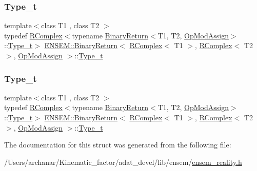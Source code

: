 \subsubsection{\texorpdfstring{Type\_t}{Type\_t}\hspace{0.1cm}{\footnotesize\ttfamily [1/2]}}
{\footnotesize\ttfamily template$<$class T1 , class T2 $>$ \\
typedef \mbox{\hyperlink{classENSEM_1_1RComplex}{R\+Complex}}$<$typename \mbox{\hyperlink{structENSEM_1_1BinaryReturn}{Binary\+Return}}$<$T1, T2, \mbox{\hyperlink{structENSEM_1_1OpModAssign}{Op\+Mod\+Assign}}$>$\+::\mbox{\hyperlink{structENSEM_1_1BinaryReturn_3_01RComplex_3_01T1_01_4_00_01RComplex_3_01T2_01_4_00_01OpModAssign_01_4_a80b31011890b63af6d1a5b429a9d9091}{Type\+\_\+t}}$>$ \mbox{\hyperlink{structENSEM_1_1BinaryReturn}{E\+N\+S\+E\+M\+::\+Binary\+Return}}$<$ \mbox{\hyperlink{classENSEM_1_1RComplex}{R\+Complex}}$<$ T1 $>$, \mbox{\hyperlink{classENSEM_1_1RComplex}{R\+Complex}}$<$ T2 $>$, \mbox{\hyperlink{structENSEM_1_1OpModAssign}{Op\+Mod\+Assign}} $>$\+::\mbox{\hyperlink{structENSEM_1_1BinaryReturn_3_01RComplex_3_01T1_01_4_00_01RComplex_3_01T2_01_4_00_01OpModAssign_01_4_a80b31011890b63af6d1a5b429a9d9091}{Type\+\_\+t}}}

\mbox{\label{structENSEM_1_1BinaryReturn_3_01RComplex_3_01T1_01_4_00_01RComplex_3_01T2_01_4_00_01OpModAssign_01_4_a80b31011890b63af6d1a5b429a9d9091}} 
\subsubsection{\texorpdfstring{Type\_t}{Type\_t}\hspace{0.1cm}{\footnotesize\ttfamily [2/2]}}
{\footnotesize\ttfamily template$<$class T1 , class T2 $>$ \\
typedef \mbox{\hyperlink{classENSEM_1_1RComplex}{R\+Complex}}$<$typename \mbox{\hyperlink{structENSEM_1_1BinaryReturn}{Binary\+Return}}$<$T1, T2, \mbox{\hyperlink{structENSEM_1_1OpModAssign}{Op\+Mod\+Assign}}$>$\+::\mbox{\hyperlink{structENSEM_1_1BinaryReturn_3_01RComplex_3_01T1_01_4_00_01RComplex_3_01T2_01_4_00_01OpModAssign_01_4_a80b31011890b63af6d1a5b429a9d9091}{Type\+\_\+t}}$>$ \mbox{\hyperlink{structENSEM_1_1BinaryReturn}{E\+N\+S\+E\+M\+::\+Binary\+Return}}$<$ \mbox{\hyperlink{classENSEM_1_1RComplex}{R\+Complex}}$<$ T1 $>$, \mbox{\hyperlink{classENSEM_1_1RComplex}{R\+Complex}}$<$ T2 $>$, \mbox{\hyperlink{structENSEM_1_1OpModAssign}{Op\+Mod\+Assign}} $>$\+::\mbox{\hyperlink{structENSEM_1_1BinaryReturn_3_01RComplex_3_01T1_01_4_00_01RComplex_3_01T2_01_4_00_01OpModAssign_01_4_a80b31011890b63af6d1a5b429a9d9091}{Type\+\_\+t}}}



The documentation for this struct was generated from the following file\+:\begin{DoxyCompactItemize}
\item 
/\+Users/archanar/\+Kinematic\+\_\+factor/adat\+\_\+devel/lib/ensem/\mbox{\hyperlink{lib_2ensem_2ensem__reality_8h}{ensem\+\_\+reality.\+h}}\end{DoxyCompactItemize}

